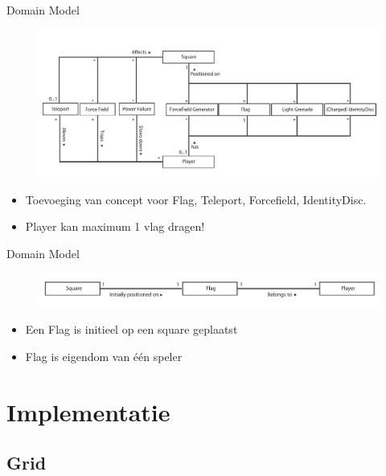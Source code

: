 \documentclass[11pt,t]{beamer}
\begin{document}
\begin{frame}{Domain Model}
\begin{center}
\begin{figure}
\includegraphics[width=0.9\linewidth]{images/domainmodel1}
\end{figure}
\end{center}
\begin{itemize}
\item Toevoeging van concept voor Flag, Teleport, Forcefield, IdentityDisc.
\item Player kan maximum 1 vlag dragen!
\end{itemize}


\end{frame}

\begin{frame}{Domain Model}
\begin{center}
\vspace{0.9in}
\begin{figure}
\includegraphics[width=1\linewidth]{images/domainmodel3}
\end{figure}
\end{center}
\begin{itemize}
\item Een Flag is initieel op een square geplaatst 
\item Flag is eigendom van \'{e}\'{e}n speler
\end{itemize}
\end{frame}

\section{Implementatie}

\subsection{Grid}
\end{document}
